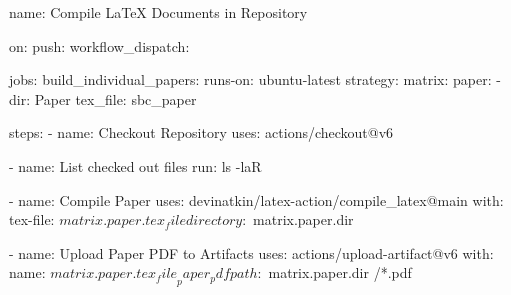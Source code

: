 name: Compile LaTeX Documents in Repository

on:
  push:
  workflow_dispatch:

jobs:
  build_individual_papers:
    runs-on: ubuntu-latest
    strategy:
      matrix:
        paper:
          - dir: Paper
            tex_file: sbc_paper

    steps:
    - name: Checkout Repository
      uses: actions/checkout@v6
  
    - name: List checked out files
      run: ls -laR
      
    - name: Compile Paper
      uses: devinatkin/latex-action/compile_latex@main
      with:
        tex-file: ${{ matrix.paper.tex_file }}
        directory: ${{ matrix.paper.dir }}

    - name: Upload Paper PDF to Artifacts
      uses: actions/upload-artifact@v6
      with:
        name: ${{ matrix.paper.tex_file }}_paper_pdf
        path: ${{ matrix.paper.dir }}/*.pdf